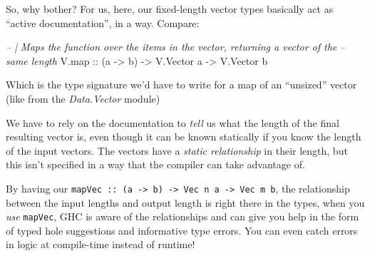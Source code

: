\documentclass[]{article}
\newenvironment{Shaded}{}{}
\newcommand{\DataTypeTok}[1]{\textcolor[rgb]{0.56,0.13,0.00}{#1}}
\newcommand{\CommentTok}[1]{\textcolor[rgb]{0.38,0.63,0.69}{\textit{#1}}}
\newcommand{\OtherTok}[1]{\textcolor[rgb]{0.00,0.44,0.13}{#1}}
\newcommand{\NormalTok}[1]{#1}
\begin{document}
So, why bother? For us, here, our fixed-length vector types basically act as
``active documentation'', in a way. Compare:

\begin{Shaded}
\begin{Highlighting}[]
\CommentTok{-- | Maps the function over the items in the vector, returning a vector of the}
\CommentTok{-- same length}
\NormalTok{V.map}\OtherTok{ ::}\NormalTok{ (a }\OtherTok{->}\NormalTok{ b) }\OtherTok{->} \DataTypeTok{V.Vector}\NormalTok{ a }\OtherTok{->} \DataTypeTok{V.Vector}\NormalTok{ b}
\end{Highlighting}
\end{Shaded}

Which is the type signature we'd have to write for a map of an ``unsized''
vector (like from the \emph{Data.Vector} module)

We have to rely on the documentation to \emph{tell} us what the length of the
final resulting vector is, even though it can be known statically if you know
the length of the input vectors. The vectors have a \emph{static relationship}
in their length, but this isn't specified in a way that the compiler can take
advantage of.

By having our
\texttt{mapVec\ ::\ (a\ -\textgreater{}\ b)\ -\textgreater{}\ Vec\ n\ a\ -\textgreater{}\ Vec\ m\ b},
the relationship between the input lengths and output length is right there in
the types, when you \emph{use} \texttt{mapVec}, GHC is aware of the
relationships and can give you help in the form of typed hole suggestions and
informative type errors. You can even catch errors in logic at compile-time
instead of runtime!
\end{document}
